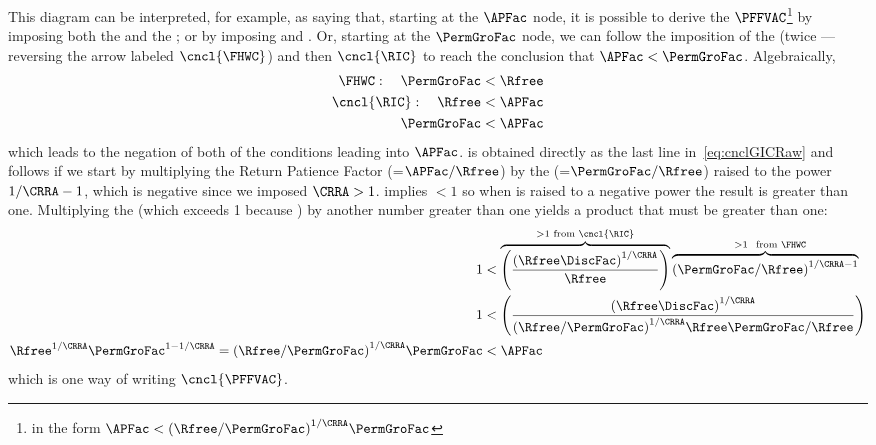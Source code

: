 \documentclass[\econtexRoot/BufferStockTheory]{subfiles}
\begin{document}
This diagram can be interpreted, for example, as saying  that, starting at the $\APFac$ node, it is possible to derive the $\PFFVAC$\footnote{in the form $\APFac < {(\Rfree/\PermGroFac)}^{1/\CRRA}\PermGroFac$} by imposing both the {\GICRaw} and the {\FHWC}; or by imposing {\RIC} and \cncl{\FHWC}.
Or, starting at the $\PermGroFac$ node, we can follow the imposition of the {\FHWC} (twice --- reversing the arrow labeled $\cncl{\FHWC}$) and then $\cncl{\RIC}$ to reach the conclusion that $\APFac < \PermGroFac$.
Algebraically,
\begin{equation}\begin{gathered}\begin{aligned}
  {\FHWC}:~~~ \PermGroFac & < \Rfree 
  \\ \cncl{\RIC}:~~~ \Rfree & < \APFac 
  \\ \PermGroFac & < \APFac \label{eq:cnclGICRaw}
\end{aligned}\end{gathered}\end{equation}
which leads to the negation of both of the conditions leading into $\APFac$.
\cncl{\GICRaw} is obtained directly as the last line in~\eqref{eq:cnclGICRaw} and \cncl{\PFFVAC} follows if we start by multiplying the Return Patience Factor ({\RPFacDefn}=$\APFac/\Rfree$) by the {\FHWFacDefn} (=$\PermGroFac/\Rfree$) raised to the power $1/\CRRA-1$, which is negative since we imposed $\CRRA > 1$.
{\FHWC} implies {\FHWFacDefn} $< 1$ so when {\FHWFacDefn} is raised to a negative power the result is greater than one.
Multiplying the {\RPFacDefn} (which exceeds 1 because \cncl{\RIC}) by another number greater than one yields a product that must be greater than one:
\begin{equation}\begin{gathered}\begin{aligned}
  1  & < \overbrace{\left(\frac{{(\Rfree \DiscFac)}^{1/\CRRA}}{\Rfree}\right)}^{>1 \text{~from~}\cncl{\RIC}}\overbrace{{\left(\PermGroFac/\Rfree\right)}^{1/\CRRA-1}}^{\phantom{\ldots}>1~\text{~from~} \FHWC} \notag
  \\ 1  & < \left(\frac{{(\Rfree \DiscFac)}^{1/\CRRA}}{{(\Rfree/\PermGroFac)}^{1/\CRRA}\Rfree\PermGroFac/\Rfree}\right) \label{eq:cnclFHWFacDefnAndcnclRICImplycnclPFFVAC}
  \\ \Rfree^{1/\CRRA}\PermGroFac^{1 - 1/\CRRA} = {(\Rfree/\PermGroFac)}^{1/\CRRA} \PermGroFac  & < \APFac \notag
\end{aligned}\end{gathered}\end{equation}
which is one way of writing $\cncl{\PFFVAC}$.
\end{document}
